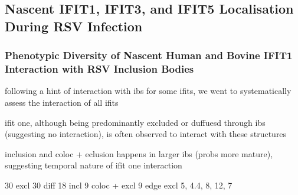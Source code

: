 \subsection{Nascent IFIT1, IFIT3, and IFIT5 Localisation During RSV Infection} \label{subsec:Nascent IFIT1, IFIT3, and IFIT5 Localisation During RSV Infection}
\subsubsection{Phenotypic Diversity of Nascent Human and Bovine IFIT1 Interaction with RSV Inclusion Bodies}
following a hint of interaction with ibs for some ifits, we went to systematically assess the interaction of all ifits

ifit one, although being predominantly excluded or duffuesd through ibs (suggesting no interaction), is often observed to interact with these structures

inclusion and coloc + eclusion happens in larger ibs (probs more mature), suggesting temporal nature of ifit one interaction

30 excl 30 diff 18 incl 9 coloc + excl 9 edge excl
5, 4.4, 8, 12, 7


